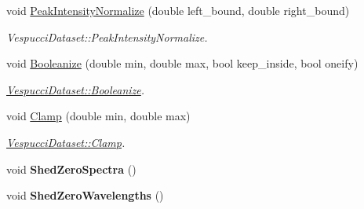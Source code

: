 \begin{DoxyCompactItemize}
\item 
void \hyperlink{class_vespucci_dataset_a358b924b2ec9277e054fb52462ff5f61}{Peak\+Intensity\+Normalize} (double left\+\_\+bound, double right\+\_\+bound)
\begin{DoxyCompactList}\small\item\em Vespucci\+Dataset\+::\+Peak\+Intensity\+Normalize. \end{DoxyCompactList}\item 
void \hyperlink{class_vespucci_dataset_a21f1635124ce556cd1578ffc1178ceef}{Booleanize} (double min, double max, bool keep\+\_\+inside, bool oneify)
\begin{DoxyCompactList}\small\item\em \hyperlink{class_vespucci_dataset_a21f1635124ce556cd1578ffc1178ceef}{Vespucci\+Dataset\+::\+Booleanize}. \end{DoxyCompactList}\item 
void \hyperlink{class_vespucci_dataset_a4b280cfa6a8a99df7594aab5ebb3e0b0}{Clamp} (double min, double max)
\begin{DoxyCompactList}\small\item\em \hyperlink{class_vespucci_dataset_a4b280cfa6a8a99df7594aab5ebb3e0b0}{Vespucci\+Dataset\+::\+Clamp}. \end{DoxyCompactList}\item 
\hypertarget{class_vespucci_dataset_a63d5387d76c9a345811b795b846e9699}{void {\bfseries Shed\+Zero\+Spectra} ()}\label{class_vespucci_dataset_a63d5387d76c9a345811b795b846e9699}

\item 
\hypertarget{class_vespucci_dataset_a77e67b083a776d38b189a1663c67efc9}{void {\bfseries Shed\+Zero\+Wavelengths} ()}\label{class_vespucci_dataset_a77e67b083a776d38b189a1663c67efc9}


\end{DoxyCompactItemize}

